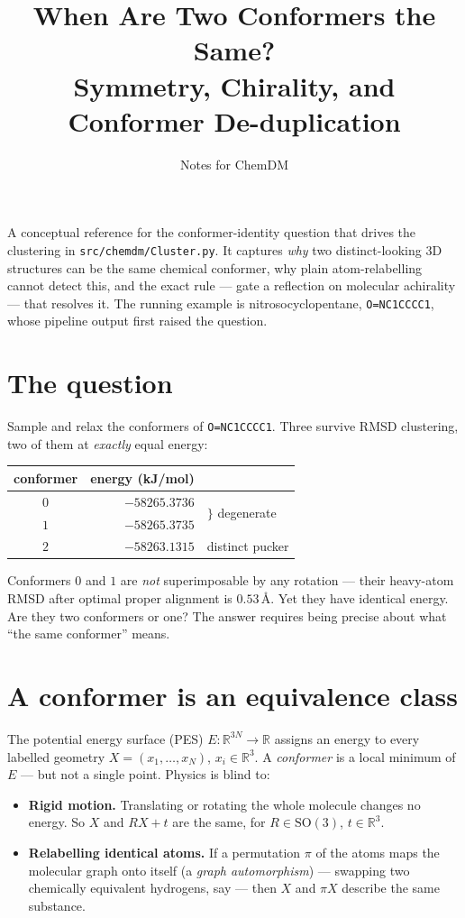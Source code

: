 \documentclass[11pt]{article}
\title{When Are Two Conformers the Same?\\
       \large Symmetry, Chirality, and Conformer De-duplication}
\author{Notes for ChemDM}
\date{}
\newcommand{\R}{\mathbb{R}}
\newcommand{\SO}{\mathrm{SO}(3)}
\begin{document}
\maketitle

\noindent
A conceptual reference for the conformer-identity question that drives the
clustering in \texttt{src/chemdm/Cluster.py}. It captures \emph{why} two
distinct-looking 3D structures can be the same chemical conformer, why plain
atom-relabelling cannot detect this, and the exact rule --- gate a reflection
on molecular achirality --- that resolves it. The running example is
nitrosocyclopentane, \texttt{O=NC1CCCC1}, whose pipeline output first raised
the question.

\section{The question}

Sample and relax the conformers of \texttt{O=NC1CCCC1}. Three survive
RMSD clustering, two of them at \emph{exactly} equal energy:

\begin{center}
\begin{tabular}{crl}
\toprule
conformer & energy (kJ/mol) & \\
\midrule
$0$ & $-58265.3736$ & \multirow{2}{*}{$\Big\}$ degenerate}\\
$1$ & $-58265.3735$ & \\
$2$ & $-58263.1315$ & distinct pucker\\
\bottomrule
\end{tabular}
\end{center}

Conformers $0$ and $1$ are \emph{not} superimposable by any rotation --- their
heavy-atom RMSD after optimal proper alignment is $0.53\,\text{\AA}$. Yet they
have identical energy. Are they two conformers or one? The answer requires
being precise about what ``the same conformer'' means.

\section{A conformer is an equivalence class}

The potential energy surface (PES) $E:\R^{3N}\to\R$ assigns an energy to every
labelled geometry $X=(x_1,\dots,x_N)$, $x_i\in\R^3$. A \emph{conformer} is a
local minimum of $E$ --- but not a single point. Physics is blind to:

\begin{itemize}
  \item \textbf{Rigid motion.} Translating or rotating the whole molecule
        changes no energy. So $X$ and $RX+t$ are the same, for $R\in\SO$,
        $t\in\R^3$.
  \item \textbf{Relabelling identical atoms.} If a permutation $\pi$ of the
        atoms maps the molecular graph onto itself (a \emph{graph
        automorphism}) --- swapping two chemically equivalent hydrogens, say
        --- then $X$ and $\pi X$ describe the same substance.
\end{itemize}
\end{document}
